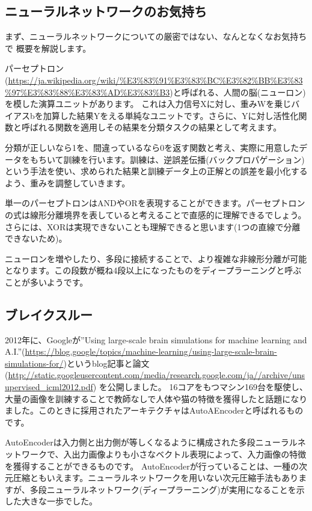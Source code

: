 \documentclass[mingoth,a4paper]{jsarticle}
\begin{document}
\subsection{ニューラルネットワークのお気持ち}

まず、ニューラルネットワークについての厳密ではない、なんとなくなお気持ちで
概要を解説します。

パーセプトロン(\url{https://ja.wikipedia.org/wiki/%E3%83%91%E3%83%BC%E3%82%BB%E3%83%97%E3%83%88%E3%83%AD%E3%83%B3})と呼ばれる、人間の脳(ニューロン)を模した演算ユニットがあります。
これは入力信号Xに対し、重みWを乗じバイアスbを加算した結果Yをえる単純なユニットです。さらに、Yに対し活性化関数と呼ばれる関数を適用しその結果を分類タスクの結果として考えます。

分類が正しいなら1を、間違っているなら0を返す関数と考え、実際に用意したデータをもちいて訓練を行います。訓練は、逆誤差伝播(バックプロパゲーション)という手法を使い、求められた結果と訓練データ上の正解との誤差を最小化するよう、重みを調整していきます。

単一のパーセプトロンはANDやORを表現することができます。パーセプトロンの式は線形分離境界を表していると考えることで直感的に理解できるでしょう。
さらには、XORは実現できないことも理解できると思います(1つの直線で分離できないため)。

ニューロンを増やしたり、多段に接続することで、より複雑な非線形分離が可能となります。この段数が概ね4段以上になったものをディープラーニングと呼ぶことが多いようです。

\subsection{ブレイクスルー}

2012年に、Googleが''Using large-scale brain simulations for machine learning and A.I.''(\url{https://blog.google/topics/machine-learning/using-large-scale-brain-simulations-for/})というblog記事と論文
(\url{http://static.googleusercontent.com/media/research.google.com/ja//archive/unsupervised_icml2012.pdf})
を公開しました。
16コアをもつマシン169台を駆使し、大量の画像を訓練することで教師なしで人体や猫の特徴を獲得したと話題になりました。このときに採用されたアーキテクチャはAutoAEncoderと呼ばれるものです。

AutoEncoderは入力側と出力側が等しくなるように構成された多段ニューラルネットワークで、入出力画像よりも小さなベクトル表現によって、入力画像の特徴を獲得することができるものです。
AutoEncoderが行っていることは、一種の次元圧縮ともいえます。ニューラルネットワークを用いない次元圧縮手法もありますが、多段ニューラルネットワーク(ディープラーニング)が実用になることを示した大きな一歩でした。
\end{document}
